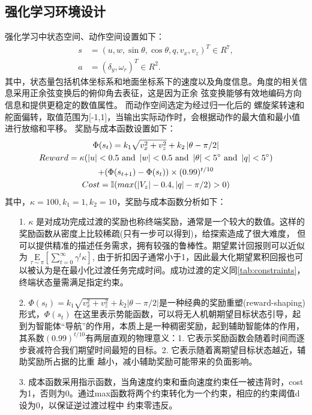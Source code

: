 \subsection{强化学习环境设计}
\label{chapter:env}
强化学习中状态空间、动作空间设置如下：
\begin{equation}
    \begin{aligned}
    s &= \left(u,w,\sin \theta , \cos \theta , q, v_{x},v_{z}\right)^{T} \in R^{7}, \\
    a &= \left(\delta_{y},\omega_{r}\right)^{T} \in R^{2}.
    \end{aligned}
\end{equation}
其中，状态量包括机体坐标系和地面坐标系下的速度以及角度信息。角度的相关信息采用正余弦变换后的俯仰角去表征，这是因为正余
弦变换能够有效地编码方向信息和提供更稳定的数值属性。
而动作空间选定为经过归一化后的
螺旋桨转速和舵面偏转，取值范围为[-1,1]，当输出实际动作时，会根据动作的最大值和最小值进行放缩和平移。
奖励与成本函数设置如下：
\begin{gather}
    \Phi (s_{t})=k_{1}\sqrt{v_{x}^{2}+v_{z}^{2}}+k_{2}\left | \theta-\pi/2 \right | \\\notag
    Reward=\kappa(\left | u \right | < 0.5 \ \text{and}\ \left | w \right | < 0.5\ \text{and}\ \left | \theta \right | < 5^{\circ}\ \text{and}\ \left | q \right | < 5^{\circ})\\ \notag
    +(\Phi (s_{t+1})-\Phi (s_{t}))\times (0.99)^{t/10}\\ \notag
    Cost=\mathbb I(max(\left | V_{z} \right |-0.4,\left | q \right |-\pi/2 )>0)  \notag
\end{gather}
其中，$\kappa=100,k_{1}=1,k_{2}=10$，奖励与成本函数分析如下：
\begin{itemize}
    \item [1.] $\kappa$ 是对成功完成过渡的奖励也称终端奖励，通常是一个较大的数值。这样的奖励函数从密度上比较稀疏(只有一步可以得到)，给探索造成了很大难度，
    但可以提供精准的描述任务需求，拥有较强的鲁棒性。期望累计回报则可以近似为
    $\underset{\tau \sim \pi }{\mathrm{E}}\left[\sum_{t=0}^{\infty} \gamma^{t}\kappa\right]$, 
    由于折扣因子通常小于1，因此最大化期望累积回报也可以被认为是在最小化过渡任务完成时间。成功过渡的定义同\autoref{tab:constraints}，终端状态量需满足指定约束。
    \item [2.] $\Phi (s_{t})=k_{1}\sqrt{v_{x}^{2}+v_{z}^{2}}+k_{2}\left | \theta-\pi/2 \right |$是一种经典的奖励重塑(reward-shaping)形式，$\Phi (s_{t})$
    在这里表示势能函数，可以将无人机朝期望目标状态引导，起到为智能体“导航”的作用，本质上是一种稠密奖励，起到辅助智能体的作用，
    其系数$(0.99)^{t/10}$有两层直观的物理意义：1. 它表示奖励函数会随着时间而逐步衰减符合我们期望时间最短的目标。2. 它表示随着离期望目标状态越近，辅助奖励所占据的比重
    越小，减小辅助奖励可能带来的负面影响。
    \item [3.] 成本函数采用指示函数，当角速度约束和垂向速度约束任一被违背时，cost为1，否则为0。通过max函数将两个约束转化为一个约束，相应的约束阈值d设为0，以保证逆过渡过程中
    约束零违反。
\end{itemize}
